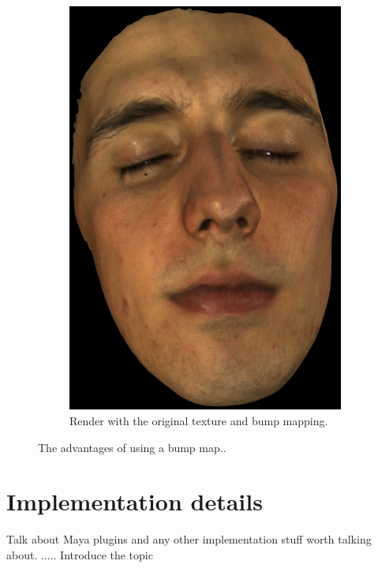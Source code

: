 \documentclass[11pt]{report}
\begin{document}
\begin{figure}
\begin{subfigure}[t]{0.48\textwidth}
                \includegraphics[width=\textwidth]{img/richard_disp_impr}
                \caption{Render with the original texture and bump mapping.}
                \label{fig:richard_disp_impr}
        \end{subfigure}
        \caption{The advantages of using a bump map..}
        \label{fig:bump_mapping_richard}
\end{figure}

\chapter{Implementation details}
\label{sec:implementation_details}

Talk about Maya plugins and any other implementation stuff worth talking about. 
..... Introduce the topic
\end{document}
